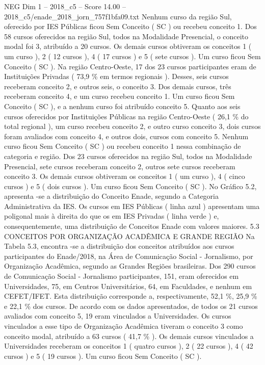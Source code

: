 \begin{textsample}{NEG Dim 1 – 2018\_c5 – Score 14.00 – 2018\_c5/enade\_2018\_jorn\_757f1bfa09.txt}
Nenhum curso da região Sul, oferecido por IES Públicas ficou Sem Conceito ( SC ) ou recebeu conceito 1.
Dos 58 cursos oferecidos na região Sul, todos na Modalidade Presencial, o conceito modal foi 3, atribuído a 20 cursos.
Os demais cursos obtiveram os conceitos 1 ( um curso ), 2 ( 12 cursos ), 4 ( 17 cursos ) e 5 ( sete cursos ).
Um curso ficou Sem Conceito ( SC ).
Na região Centro-Oeste, 17 dos 23 cursos participantes eram de Instituições Privadas ( 73,9 \% em termos regionais ).
Desses, seis cursos receberam conceito 2, e outros seis, o conceito 3.
Dos demais cursos, três receberam conceito 4, e um curso recebeu conceito 1.
Um curso ficou Sem Conceito ( SC ), e a nenhum curso foi atribuído conceito 5.
Quanto aos seis cursos oferecidos por Instituições Públicas na região Centro-Oeste ( 26,1 \% do total regional ), um curso recebeu conceito 2, e outro curso conceito 3, dois cursos foram avaliados com conceito 4, e outros dois, cursos com conceito 5.
Nenhum curso ficou Sem Conceito ( SC ) ou recebeu conceito 1 nessa combinação de categoria e região.
Dos 23 cursos oferecidos na região Sul, todos na Modalidade Presencial, sete cursos receberam conceito 2, outros sete cursos receberam conceito 3.
Os demais cursos obtiveram os conceitos 1 ( um curso ), 4 ( cinco cursos ) e 5 ( dois cursos ).
Um curso ficou Sem Conceito ( SC ).
No Gráfico 5.2, apresenta -se a distribuição do Conceito Enade, segundo a Categoria Administrativa da IES.
Os cursos em IES Públicas ( linha azul ) apresentam uma poligonal mais à direita do que os em IES Privadas ( linha verde ) e, consequentemente, uma distribuição de Conceitos Enade com valores maiores. 5.3 CONCEITOS POR ORGANIZAÇÃO ACADÊMICA E GRANDE REGIÃO Na Tabela 5.3, encontra -se a distribuição dos conceitos atribuídos aos cursos participantes do Enade/2018, na Área de Comunicação Social - Jornalismo, por Organização Acadêmica, segundo as Grandes Regiões brasileiras.
Dos 290 cursos de Comunicação Social - Jornalismo participantes, 151, eram oferecidos em Universidades, 75, em Centros Universitários, 64, em Faculdades, e nenhum em CEFET/IFET.
Esta distribuição corresponde a, respectivamente, 52,1 \%, 25,9 \% e 22,1 \% dos cursos.
De acordo com os dados apresentados, de todos os 21 cursos avaliados com conceito 5, 19 eram vinculados a Universidades.
Os cursos vinculados a esse tipo de Organização Acadêmica tiveram o conceito 3 como conceito modal, atribuído a 63 cursos ( 41,7 \% ).
Os demais cursos vinculados a Universidades receberam os conceitos 1 ( quatro cursos ), 2 ( 22 cursos ), 4 ( 42 cursos ) e 5 ( 19 cursos ).
Um curso ficou Sem Conceito ( SC ).

\end{textsample}
